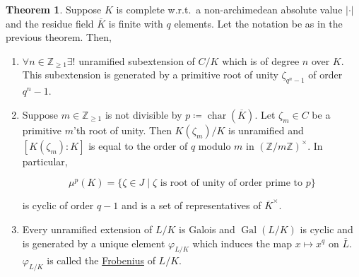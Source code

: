 \documentclass[openany]{amsbook}
\numberwithin{section}{chapter}
\theoremstyle{definition}
\newtheorem{theorem}{Theorem}[chapter]
\begin{document}
\begin{theorem}
    Suppose \(K\) is complete w.r.t.\ a non-archimedean absolute value \(\vert \cdot \vert\) and the residue field \(\overline{K}\) is finite with \(q\) elements. Let the notation be as in the previous theorem. Then,

    \begin{enumerate}[label=\roman*)]
        \item \(\forall n\in \mathbb{Z}_{\geq 1} \exists !\) unramified subextension of \(C / K\) which is of degree \(n\) over \(K\). This subextension is generated by a primitive root of unity \(\zeta_{q^n - 1}\) of order \(q^n - 1\).
        
        \item Suppose \(m\in \mathbb{Z}_{\geq 1}\) is not divisible by \(p \coloneqq \operatorname{char}(\overline{K})\).  Let \(\zeta_m \in C\) be a primitive \(m\)'th root of unity. Then \(K(\zeta_m) / K\) is unramified and \([K(\zeta_m):K]\) is equal to the order of \(q\) modulo \(m\) in \((\mathbb{Z} / m\mathbb{Z})^\times\). In particular, 
        
        \[
            \mu^p(K) = \{ \zeta \in J \mid \zeta \text{ is root of unity of order prime to } p \} 
        \]

        is cyclic of order \(q-1\) and is a set of representatives of \(\overline{K}^\times\).

        \item Every unramified extension of \(L / K\) is Galois and \(\operatorname{Gal}(L / K)\) is cyclic and is generated by a unique element \(\varphi_{L / K}\) which induces the map \(x \mapsto x^q\) on \(\overline{L}\). \(\varphi_{L / K}\) is called the \underline{Frobenius} of \(L / K\).
    \end{enumerate} 
\end{theorem}
\end{document}
